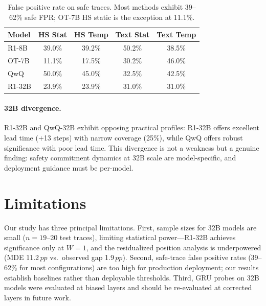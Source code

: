 \documentclass[11pt,a4paper]{article}
\newcommand{\pp}{\,pp}
\begin{document}
\begin{table}[t]
\centering
\small
\begin{tabular}{lcccc}
\toprule
\textbf{Model} & \textbf{HS Stat} & \textbf{HS Temp} & \textbf{Text Stat} & \textbf{Text Temp} \\
\midrule
R1-8B & 39.0\% & 39.2\% & 50.2\% & 38.5\% \\
OT-7B & 11.1\% & 17.5\% & 30.2\% & 46.0\% \\
QwQ & 50.0\% & 45.0\% & 32.5\% & 42.5\% \\
R1-32B & 23.9\% & 23.9\% & 31.0\% & 31.0\% \\
\bottomrule
\end{tabular}
\caption{False positive rate on safe traces. Most methods exhibit 39--62\% safe FPR; OT-7B HS static is the exception at 11.1\%.}
\label{tab:safe_fpr}
\end{table}

\paragraph{32B divergence.}
R1-32B and QwQ-32B exhibit opposing practical profiles: R1-32B offers excellent lead time ($+$13 steps) with narrow coverage (25\%), while QwQ offers robust significance with poor lead time.
This divergence is not a weakness but a genuine finding: safety commitment dynamics at 32B scale are model-specific, and deployment guidance must be per-model.

\section{Limitations}
\label{sec:limitations}

Our study has three principal limitations.
First, sample sizes for 32B models are small ($n=19$--20 test traces), limiting statistical power---R1-32B achieves significance only at $W=1$, and the residualized position analysis is underpowered (MDE 11.2$\pp$ vs.\ observed gap 1.9$\pp$).
Second, safe-trace false positive rates (39--62\% for most configurations) are too high for production deployment; our results establish baselines rather than deployable thresholds.
Third, GRU probes on 32B models were evaluated at biased layers and should be re-evaluated at corrected layers in future work.

\end{document}
